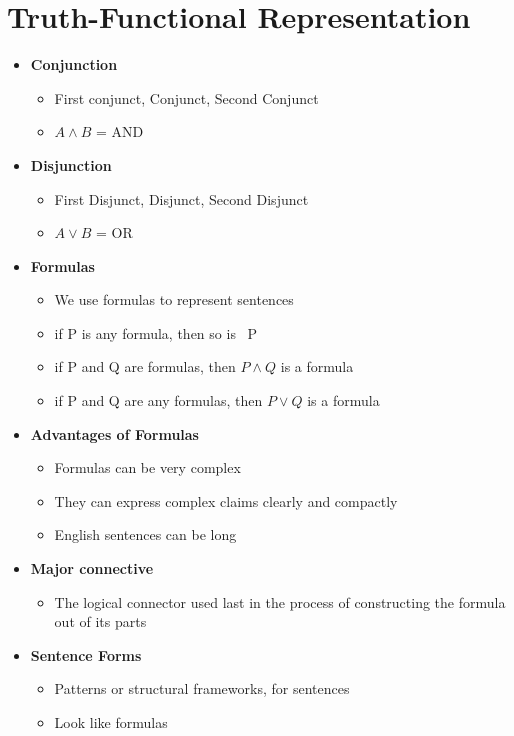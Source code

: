 \documentclass{report}
\begin{document}
	\section{Truth-Functional Representation}
	\begin{itemize}\addtolength{\leftskip}{2em}
	
		\item \textbf{Conjunction}
		\begin{itemize}\addtolength{\leftskip}{4em}
			\item First conjunct, Conjunct, Second Conjunct
			\item $A\wedge B$ = AND
		\end{itemize}
		
		\item \textbf{Disjunction}
		\begin{itemize}\addtolength{\leftskip}{4em}
			\item First Disjunct, Disjunct, Second Disjunct
			\item $A\vee B$ = OR
		\end{itemize}
		
		\item\textbf{Formulas}
		\begin{itemize}\addtolength{\leftskip}{4em}
			\item We use formulas to represent sentences
			\item if P is any formula, then so is ~P
			\item if P and Q are formulas, then $P\wedge Q$ is a formula
			\item if P and Q are any formulas, then $P\vee Q$ is a formula
		\end{itemize}
			
		\item\textbf{Advantages of Formulas}
		\begin{itemize}\addtolength{\leftskip}{4em}
			\item Formulas can be very complex
			\item They can express complex claims clearly and compactly
			\item English sentences can be long
		\end{itemize}
	
		\item\textbf{Major connective}
		\begin{itemize}\addtolength{\leftskip}{4em}
			\item The logical connector used last in the process of constructing the formula out of its parts
		\end{itemize}
		
		
		\item\textbf{Sentence Forms}
		\begin{itemize}\addtolength{\leftskip}{4em}
			\item Patterns or structural frameworks, for sentences
			\item Look like formulas
		\end{itemize}
	\end{itemize}
			
\end{document}
